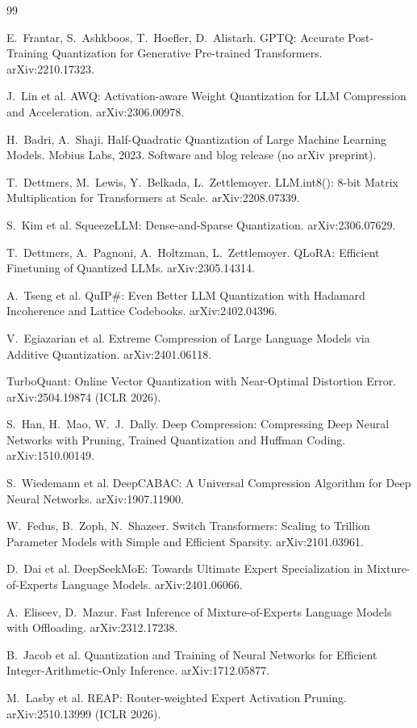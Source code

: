 \documentclass[11pt]{article}
\begin{document}
\begin{thebibliography}{99}

 E.~Frantar, S.~Ashkboos, T.~Hoefler, D.~Alistarh.
GPTQ: Accurate Post-Training Quantization for Generative Pre-trained
Transformers. arXiv:2210.17323.

 J.~Lin et al.
AWQ: Activation-aware Weight Quantization for LLM Compression and Acceleration.
arXiv:2306.00978.

 H.~Badri, A.~Shaji.
Half-Quadratic Quantization of Large Machine Learning Models. Mobius Labs, 2023.
Software and blog release (no arXiv preprint).

 T.~Dettmers, M.~Lewis, Y.~Belkada, L.~Zettlemoyer.
LLM.int8(): 8-bit Matrix Multiplication for Transformers at Scale.
arXiv:2208.07339.

 S.~Kim et al.
SqueezeLLM: Dense-and-Sparse Quantization. arXiv:2306.07629.

 T.~Dettmers, A.~Pagnoni, A.~Holtzman, L.~Zettlemoyer.
QLoRA: Efficient Finetuning of Quantized LLMs. arXiv:2305.14314.

 A.~Tseng et al.
QuIP\#: Even Better LLM Quantization with Hadamard Incoherence and Lattice
Codebooks. arXiv:2402.04396.

 V.~Egiazarian et al.
Extreme Compression of Large Language Models via Additive Quantization.
arXiv:2401.06118.

 TurboQuant: Online Vector Quantization with Near-Optimal
Distortion Error. arXiv:2504.19874 (ICLR 2026).

 S.~Han, H.~Mao, W.~J.~Dally.
Deep Compression: Compressing Deep Neural Networks with Pruning, Trained
Quantization and Huffman Coding. arXiv:1510.00149.

 S.~Wiedemann et al.
DeepCABAC: A Universal Compression Algorithm for Deep Neural Networks.
arXiv:1907.11900.

 W.~Fedus, B.~Zoph, N.~Shazeer.
Switch Transformers: Scaling to Trillion Parameter Models with Simple and
Efficient Sparsity. arXiv:2101.03961.

 D.~Dai et al.
DeepSeekMoE: Towards Ultimate Expert Specialization in Mixture-of-Experts
Language Models. arXiv:2401.06066.

 A.~Eliseev, D.~Mazur.
Fast Inference of Mixture-of-Experts Language Models with Offloading.
arXiv:2312.17238.

 B.~Jacob et al.
Quantization and Training of Neural Networks for Efficient
Integer-Arithmetic-Only Inference. arXiv:1712.05877.

 M.~Lasby et al.
REAP: Router-weighted Expert Activation Pruning. arXiv:2510.13999 (ICLR 2026).

\end{thebibliography}
\end{document}
